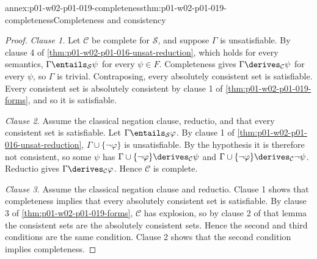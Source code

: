 \begin{annexitem}{annex:p01-w02-p01-019-completeness}{thm:p01-w02-p01-019-completeness}{Completeness and consistency}
\begin{proof}
\emph{Clause 1.} Let \(\mathcal C\) be complete for \(\mathcal S\), and
suppose \(\Gamma\) is unsatisfiable. By clause 4 of
\cref{thm:p01-w02-p01-016-unsat-reduction}, which holds for every semantics,
\(\Gamma\entails_{\mathcal S}\psi\) for every \(\psi\in F\). Completeness
gives \(\Gamma\derives_{\mathcal C}\psi\) for every \(\psi\), so \(\Gamma\) is
trivial. Contraposing, every absolutely consistent set is satisfiable. Every
consistent set is absolutely consistent by clause 1 of
\cref{thm:p01-w02-p01-019-forms}, and so it is satisfiable.

\emph{Clause 2.} Assume the classical negation clause, reductio, and that
every consistent set is satisfiable. Let \(\Gamma\entails_{\mathcal S}\varphi\).
By clause 1 of \cref{thm:p01-w02-p01-016-unsat-reduction},
\(\Gamma\cup\{\neg\varphi\}\) is unsatisfiable. By the hypothesis it is
therefore not consistent, so some \(\psi\) has
\(\Gamma\cup\{\neg\varphi\}\derives_{\mathcal C}\psi\) and
\(\Gamma\cup\{\neg\varphi\}\derives_{\mathcal C}\neg\psi\). Reductio gives
\(\Gamma\derives_{\mathcal C}\varphi\). Hence \(\mathcal C\) is complete.

\emph{Clause 3.} Assume the classical negation clause and reductio. Clause 1
shows that completeness implies that every absolutely consistent set is
satisfiable. By clause 3 of \cref{thm:p01-w02-p01-019-forms}, \(\mathcal C\)
has explosion, so by clause 2 of that lemma the consistent sets are the
absolutely consistent sets. Hence the second and third conditions are the
same condition. Clause 2 shows that the second condition implies
completeness.
\end{proof}
\end{annexitem}

